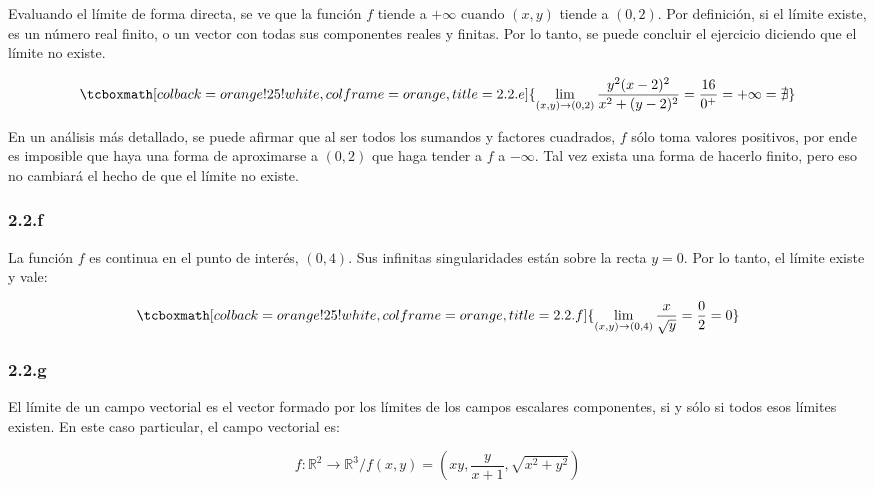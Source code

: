 \documentclass{article}
\renewcommand{\Bbb}{\mathbb}
\begin{document}
Evaluando el límite de forma directa, se ve que la función $f$ tiende a $+\infty$ cuando $(x,y)$ tiende a $(0,2)$. Por definición, si el límite existe, es un número real finito, o un vector con todas sus componentes reales y finitas. Por lo tanto, se puede concluir el ejercicio diciendo que el límite no existe.

\begin{equation}
\tcboxmath[colback=orange!25!white,colframe=orange,title=2.2.e]
{ \lim_{(x,y) \rightarrow (0,2)} \frac{y^2 (x-2)^2}{x^2 + (y-2)^2} = \frac{16}{0^+} = +\infty = \nexists }
\end{equation}

En un análisis más detallado, se puede afirmar que al ser todos los sumandos y factores cuadrados, $f$ sólo toma valores positivos, por ende es imposible que haya una forma de aproximarse a $(0,2)$ que haga tender a $f$ a $-\infty$. Tal vez exista una forma de hacerlo finito, pero eso no cambiará el hecho de que el límite no existe. 

\subsubsection*{2.2.f}
\label{subsubsec:2.2.f}

La función $f$ es continua en el punto de interés, $(0, 4)$. Sus infinitas singularidades están sobre la recta $y = 0$. Por lo tanto, el límite existe y vale:

\begin{equation}
\tcboxmath[colback=orange!25!white,colframe=orange,title=2.2.f]
{ \lim_{(x,y) \rightarrow (0,4)} \frac{x}{\sqrt{y}} = \frac{0}{2} = 0 }
\end{equation}

\subsubsection*{2.2.g}
\label{subsubsec:2.2.g}

El límite de un campo vectorial es el vector formado por los límites de los campos escalares componentes, si y sólo si todos esos límites existen. En este caso particular, el campo vectorial es:

\begin{equation}
f: \Bbb R^2 \rightarrow \Bbb R^3 / f(x,y) = \left( x y, \frac{y}{x+1}, \sqrt{x^2 + y^2} \right)
\end{equation}
\end{document}
